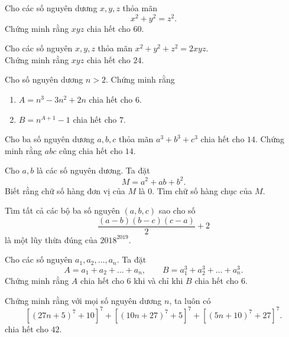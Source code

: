 \begin{btt}
Cho các số nguyên dương $x,y,z$ thỏa mãn 
\[x^2+y^2=z^2.\]
Chứng minh rằng $xyz$ chia hết cho $60.$
\end{btt}

\begin{btt}
Cho các số nguyên $x,y,z$ thỏa mãn $x^2+y^2+z^2=2xyz.$ \\Chứng minh rằng $xyz$ chia hết cho $24.$
\end{btt}

\begin{btt}
Cho số nguyên dương $n>2.$ Chứng minh rằng
\begin{enumerate}[a,]
    \item $A=n^3-3n^2+2n$ chia hết cho $6.$
    \item $B=n^{A+1}-1$ chia hết cho $7.$
\end{enumerate}
\end{btt}

\begin{btt}
Cho ba số nguyên dương $a,b,c$ thỏa mãn $a^3+b^3+c^3$ chia hết cho $14.$ Chứng minh rằng $abc$ cũng chia hết cho $14.$
\end{btt}

\begin{btt}
Cho $a,b$ là các số nguyên dương. Ta đặt
$$M=a^2+ab+b^2.$$
Biết rằng chữ số hàng đơn vị của $M$ là $0.$ Tìm chữ số hàng chục của $M$.
\end{btt}

\begin{btt}
Tìm tất cả các bộ ba số nguyên $(a, b, c)$ sao cho số $$\dfrac{(a-b)(b-c)(c-a)}{2}+2$$ là một lũy thừa đúng của $2018^{2019}.$
\end{btt}

\begin{btt}
Cho các số nguyên $a_1,a_2,\ldots,a_n$. Ta đặt 
$$A=a_1+a_2+\ldots+a_n,\qquad B=a_1^3+a_2^3+\ldots+a_n^3.$$ 
Chứng minh rằng $A$ chia hết cho $6$ khi và chỉ khi $B$ chia hết cho $6.$
\end{btt}

\begin{btt}
Chứng minh rằng với mọi số nguyên dương $n$, ta luôn có
$$\left[(27 n+5)^{7}+10\right]^{7}+\left[(10 n+27)^{7}+5\right]^{7}+\left[(5 n+10)^{7}+27\right]^{7}.$$
chia hết cho $42.$
\end{btt}

